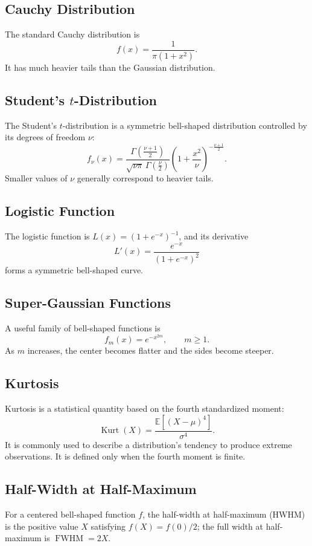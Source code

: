 \documentclass[11pt]{article}
\theoremstyle{definition}
\theoremstyle{plain}
\theoremstyle{remark}
\begin{document}
\subsection{Cauchy Distribution}
The standard Cauchy distribution is
\[
f(x)=\frac{1}{\pi(1+x^2)} .
\]
It has much heavier tails than the Gaussian distribution.

\subsection{Student's $t$-Distribution}
The Student's $t$-distribution is a symmetric bell-shaped distribution controlled by its
degrees of freedom $\nu$:
\[
f_\nu(x)=\frac{\Gamma\!\left(\frac{\nu+1}{2}\right)}
{\sqrt{\nu\pi}\,\Gamma\!\left(\frac{\nu}{2}\right)}
\left(1+\frac{x^2}{\nu}\right)^{-\frac{\nu+1}{2}} .
\]
Smaller values of $\nu$ generally correspond to heavier tails.

\subsection{Logistic Function}
The logistic function is $L(x)=\left(1+e^{-x}\right)^{-1}$, and its derivative
\[
L'(x)=\frac{e^{-x}}{(1+e^{-x})^2}
\]
forms a symmetric bell-shaped curve.

\subsection{Super-Gaussian Functions}
A useful family of bell-shaped functions is
\[
f_m(x)=e^{-x^{2m}},\qquad m\geq1 .
\]
As $m$ increases, the center becomes flatter and the sides become steeper.

\subsection{Kurtosis}
Kurtosis is a statistical quantity based on the fourth standardized moment:
\[
\operatorname{Kurt}(X)=\frac{\mathbb{E}\left[(X-\mu)^4\right]}{\sigma^4}.
\]
It is commonly used to describe a distribution's tendency to produce extreme
observations. It is defined only when the fourth moment is finite.

\subsection{Half-Width at Half-Maximum}
For a centered bell-shaped function $f$, the half-width at half-maximum (HWHM) is the
positive value $X$ satisfying $f(X)=f(0)/2$; the full width at half-maximum is
$\operatorname{FWHM}=2X$.
\end{document}

